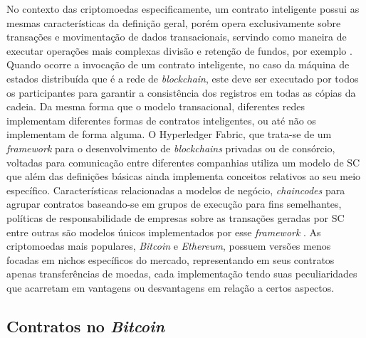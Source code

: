 %
No contexto das criptomoedas especificamente, um contrato inteligente possui as mesmas características da definição geral, porém opera exclusivamente sobre transações e movimentação de dados transacionais, servindo como maneira de executar operações mais complexas divisão e retenção de fundos, por exemplo \cite{blockchain:mastering_bitcoin}. Quando ocorre a invocação de um contrato inteligente, no caso da máquina de estados distribuída que é a rede de \textit{blockchain}, este deve ser executado por todos os participantes para garantir a consistência dos registros em todas as cópias da cadeia. Da mesma forma que o modelo transacional, diferentes redes implementam diferentes formas de contratos inteligentes, ou até não os implementam de forma alguma. O Hyperledger Fabric, que trata-se de um \textit{framework} para o desenvolvimento de \textit{blockchains} privadas ou de consórcio, voltadas para comunicação entre diferentes companhias utiliza um modelo de \ac{SC} que além das definições básicas ainda implementa conceitos relativos ao seu meio específico. Características relacionadas a modelos de negócio, \textit{chaincodes} para agrupar contratos baseando-se em grupos de execução para fins semelhantes, políticas de responsabilidade de empresas sobre as transações geradas por \ac{SC} entre outras são modelos únicos implementados por esse \textit{framework} \cite{smart_contracts:hyperledger_fabric}. As criptomoedas mais populares, \textit{Bitcoin} e \textit{Ethereum}, possuem versões menos focadas em nichos específicos do mercado, representando em seus contratos apenas transferências de moedas, cada implementação tendo suas peculiaridades que acarretam em vantagens ou desvantagens em relação a certos aspectos.

\subsection{Contratos no \textit{Bitcoin}}


